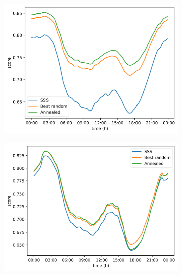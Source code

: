 \begin{figure}[H]
    \begin{subfigure}{.5\textwidth}
      \centering
      \includegraphics[width=\linewidth]{img/switchstate_exploring/suburb2/compare_over_time.png}
      \caption{}
      \label{fig:time:suburb2:sss_vs_optimized}
    \end{subfigure}%
    \begin{subfigure}{.5\textwidth}
        \centering
        \includegraphics[width=\linewidth]{img/switchstate_exploring/urban2/compare_over_time.png}
        \caption{}
        \label{fig:time:urban2:sss_vs_optimized}
    \end{subfigure}
    \\
    \begin{subfigure}{.5\textwidth}

\end{subfigure}
\end{figure}
